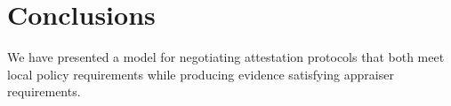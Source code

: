 \documentclass[sigconf,authordraft]{acmart}
\begin{document}

\section{Conclusions}

We have presented a model for negotiating attestation protocols that
both meet local policy requirements while producing evidence
satisfying appraiser requirements.

\nocite{Coker::Principles-of-R,Ramsdell:2019aa,Petz:2019aa}



\end{document}
